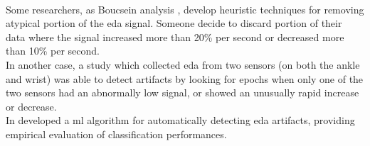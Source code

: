 \\
Some researchers, as Boucsein analysis \cite{boucsein2012electrodermal}, develop heuristic techniques for removing atypical portion of the \gls{eda} signal. Someone decide to discard portion of their data where the signal increased more than 20\% per second or decreased more than 10\% per second.
\\
In another case, a study which collected \gls{eda} from two sensors (on both the ankle and wrist) \cite{hedman2010situ} was able to detect artifacts by looking for epochs when only one of the two sensors had an abnormally low signal, or showed an unusually rapid increase or decrease.
\\ \indent
In \cite{taylor2015automatic} developed a \gls{ml} algorithm for automatically detecting \gls{eda} artifacts, providing empirical evaluation of classification performances.

